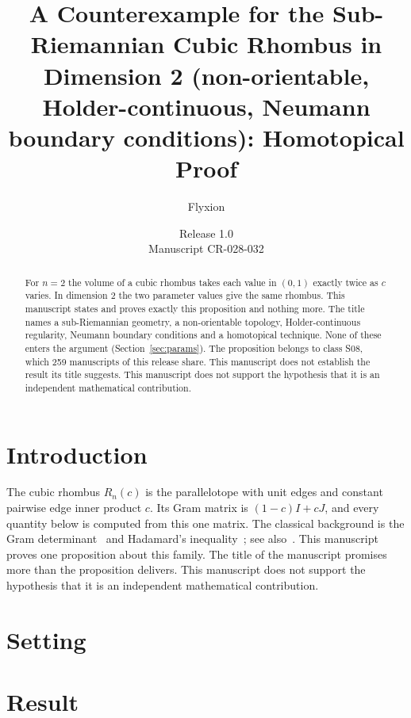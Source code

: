 \documentclass[11pt]{article}
\title{A Counterexample for the Sub-Riemannian Cubic Rhombus in Dimension 2 (non-orientable, Holder-continuous, Neumann boundary conditions): Homotopical Proof}
\author{Flyxion}
\date{Release 1.0\\ Manuscript CR-028-032}
\begin{document}
\maketitle
\begin{abstract}
For $n=2$ the volume of a cubic rhombus takes each value in $(0,1)$ exactly twice as $c$ varies. In dimension $2$ the two parameter values give the same rhombus. This manuscript states and proves exactly this proposition and nothing more. The title names a sub-Riemannian geometry, a non-orientable topology, Holder-continuous regularity, Neumann boundary conditions and a homotopical technique. None of these enters the argument (Section~\ref{sec:params}). The proposition belongs to class S08, which 259 manuscripts of this release share. This manuscript does not establish the result its title suggests. This manuscript does not support the hypothesis that it is an independent mathematical contribution.
\end{abstract}

\section{Introduction}
The cubic rhombus $R_n(c)$ is the parallelotope with unit edges and constant pairwise edge inner product $c$. Its Gram matrix is $(1-c)I+cJ$, and every quantity below is computed from this one matrix. The classical background is the Gram determinant~\cite{gram} and Hadamard's inequality~\cite{hadamard}; see also~\cite{hj}.
This manuscript proves one proposition about this family. The title of the manuscript promises more than the proposition delivers. This manuscript does not support the hypothesis that it is an independent mathematical contribution.

\section{Setting}


\section{Result}

\end{document}
